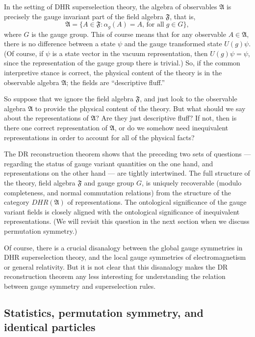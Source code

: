 \documentclass[11pt]{article}
\theoremstyle{definition}
\theoremstyle{definition}
\theoremstyle{remark}
\def\al#1{{\mathfrak #1}}
\def\a{\alpha} \def\b{\beta} \def\g{\gamma} \def\d{\delta}
\begin{document}
In the setting of DHR superselection theory, the algebra of
  observables $\al A$ is precisely the gauge invariant part of the
  field algebra $\al F$, that is,
$$ \al A = \{ A\in \al F:\a _g(A)=A, \,\mbox{for all}\; g\in G \} ,$$ where $G$ is the
gauge group.  This of course means that for any observable $A\in \al
A$, there is no difference between a state $\psi$ and the gauge
transformed state $U(g)\psi$.  (Of course, if $\psi$ is a state vector
in the vacuum representation, then $U(g)\psi =\psi$, since the
representation of the gauge group there is trivial.)  So, if the
common interpretive stance is correct, the physical content of the
theory is in the observable algebra $\al A$; the fields are
``descriptive fluff.''

So suppose that we ignore the field algebra $\al F$, and just look to
the observable algebra $\al A$ to provide the physical content of the
theory.  But what should we say about the representations of $\al A$?
Are they just descriptive fluff?  If not, then is there one correct
representation of $\al A$, or do we somehow need inequivalent
representations in order to account for all of the physical facts? 

The DR reconstruction theorem shows that the preceding two sets of
questions --- regarding the status of gauge variant quantities on the
one hand, and representations on the other hand --- are tightly
intertwined.  The full structure of the theory, field algebra $\al F$
and gauge group $G$, is uniquely recoverable (modulo completeness, and
normal commutation relations) from the structure of the category
$DHR(\al A)$ of representations.  The ontological significance of the
gauge variant fields is closely aligned with the ontological
significance of inequivalent representations.  (We will revisit this
question in the next section when we discuss permutation symmetry.)

Of course, there is a crucial disanalogy between the global gauge
symmetries in DHR superselection theory, and the local gauge
symmetries of electromagnetism or general relativity.  But it is not
clear that this disanalogy makes the DR reconstruction theorem any
less interesting for understanding the relation between gauge symmetry
and superselection rules.




\subsection{Statistics, permutation symmetry, and identical particles}
\end{document}
